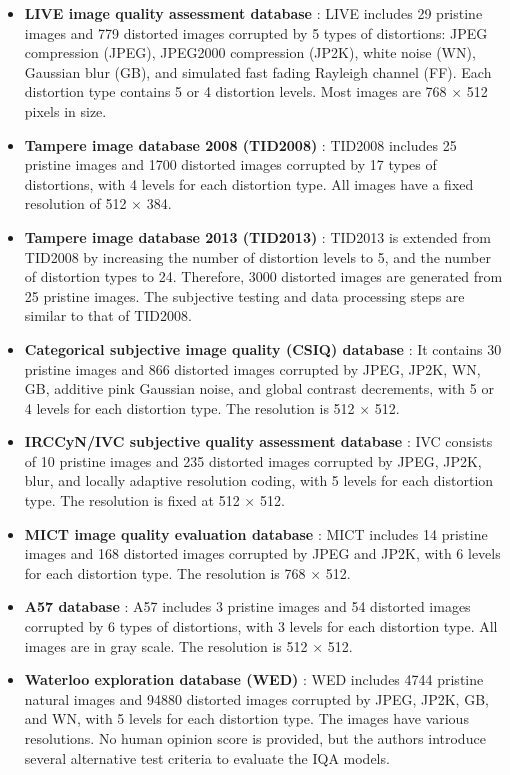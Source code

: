 \begin{itemize}
    \item \textbf{LIVE image quality assessment database} \cite{LIVE}: LIVE includes 29 pristine images and 779 distorted images corrupted by 5 types of distortions: JPEG compression (JPEG), JPEG2000 compression (JP2K), white noise (WN), Gaussian blur (GB), and simulated fast fading Rayleigh channel (FF). Each distortion type contains 5 or 4 distortion levels. Most images are 768 $\times$ 512 pixels in size.
    \item \textbf{Tampere image database 2008 (TID2008)} \cite{TID2008}: TID2008 includes 25 pristine images and 1700 distorted images corrupted by 17 types of distortions, with 4 levels for each distortion type. All images have a fixed resolution of 512 $\times$ 384.
    \item \textbf{Tampere image database 2013 (TID2013)} \cite{TID2013}: TID2013 is extended from TID2008 by increasing the number of distortion levels to 5, and the number of distortion types to 24. Therefore, 3000 distorted images are generated from 25 pristine images. The subjective testing and data processing steps are similar to that of TID2008.
    \item \textbf{Categorical subjective image quality (CSIQ) database} \cite{CSIQ}: It contains 30 pristine images and 866 distorted images corrupted by JPEG, JP2K, WN, GB, additive pink Gaussian noise, and global contrast decrements, with 5 or 4 levels for each distortion type. The resolution is 512 $\times$ 512.
    \item \textbf{IRCCyN/IVC subjective quality assessment database} \cite{IVC}: IVC consists of 10 pristine images and 235 distorted images corrupted by JPEG, JP2K, blur, and locally adaptive resolution coding, with 5 levels for each distortion type. The resolution is fixed at 512 $\times$ 512.
    \item \textbf{MICT image quality evaluation database} \cite{MICT}: MICT includes 14 pristine images and 168 distorted images corrupted by JPEG and JP2K, with 6 levels for each distortion type. The resolution is 768 $\times$ 512.
    \item \textbf{A57 database} \cite{A57}: A57 includes 3 pristine images and 54 distorted images corrupted by 6 types of distortions, with 3 levels for each distortion type. All images are in gray scale. The resolution is 512 $\times$ 512.
    \item \textbf{Waterloo exploration database (WED)} \cite{WED}: WED includes 4744 pristine natural images and 94880 distorted images corrupted by JPEG, JP2K, GB, and WN, with 5 levels for each distortion type. The images have various resolutions. No human opinion score is provided, but the authors introduce several alternative test criteria to evaluate the IQA models.
\end{itemize}

